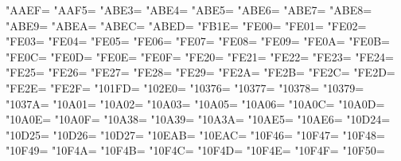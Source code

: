 \XeTeXcharclass"AAEF=\KclassCM
\XeTeXcharclass"AAF5=\KclassCM
\XeTeXcharclass"ABE3=\KclassCM
\XeTeXcharclass"ABE4=\KclassCM
\XeTeXcharclass"ABE5=\KclassCM
\XeTeXcharclass"ABE6=\KclassCM
\XeTeXcharclass"ABE7=\KclassCM
\XeTeXcharclass"ABE8=\KclassCM
\XeTeXcharclass"ABE9=\KclassCM
\XeTeXcharclass"ABEA=\KclassCM
\XeTeXcharclass"ABEC=\KclassCM
\XeTeXcharclass"ABED=\KclassCM
\XeTeXcharclass"FB1E=\KclassCM
\XeTeXcharclass"FE00=\KclassCM
\XeTeXcharclass"FE01=\KclassCM
\XeTeXcharclass"FE02=\KclassCM
\XeTeXcharclass"FE03=\KclassCM
\XeTeXcharclass"FE04=\KclassCM
\XeTeXcharclass"FE05=\KclassCM
\XeTeXcharclass"FE06=\KclassCM
\XeTeXcharclass"FE07=\KclassCM
\XeTeXcharclass"FE08=\KclassCM
\XeTeXcharclass"FE09=\KclassCM
\XeTeXcharclass"FE0A=\KclassCM
\XeTeXcharclass"FE0B=\KclassCM
\XeTeXcharclass"FE0C=\KclassCM
\XeTeXcharclass"FE0D=\KclassCM
\XeTeXcharclass"FE0E=\KclassCM
\XeTeXcharclass"FE0F=\KclassCM
\XeTeXcharclass"FE20=\KclassCM
\XeTeXcharclass"FE21=\KclassCM
\XeTeXcharclass"FE22=\KclassCM
\XeTeXcharclass"FE23=\KclassCM
\XeTeXcharclass"FE24=\KclassCM
\XeTeXcharclass"FE25=\KclassCM
\XeTeXcharclass"FE26=\KclassCM
\XeTeXcharclass"FE27=\KclassCM
\XeTeXcharclass"FE28=\KclassCM
\XeTeXcharclass"FE29=\KclassCM
\XeTeXcharclass"FE2A=\KclassCM
\XeTeXcharclass"FE2B=\KclassCM
\XeTeXcharclass"FE2C=\KclassCM
\XeTeXcharclass"FE2D=\KclassCM
\XeTeXcharclass"FE2E=\KclassCM
\XeTeXcharclass"FE2F=\KclassCM
\XeTeXcharclass"101FD=\KclassCM
\XeTeXcharclass"102E0=\KclassCM
\XeTeXcharclass"10376=\KclassCM
\XeTeXcharclass"10377=\KclassCM
\XeTeXcharclass"10378=\KclassCM
\XeTeXcharclass"10379=\KclassCM
\XeTeXcharclass"1037A=\KclassCM
\XeTeXcharclass"10A01=\KclassCM
\XeTeXcharclass"10A02=\KclassCM
\XeTeXcharclass"10A03=\KclassCM
\XeTeXcharclass"10A05=\KclassCM
\XeTeXcharclass"10A06=\KclassCM
\XeTeXcharclass"10A0C=\KclassCM
\XeTeXcharclass"10A0D=\KclassCM
\XeTeXcharclass"10A0E=\KclassCM
\XeTeXcharclass"10A0F=\KclassCM
\XeTeXcharclass"10A38=\KclassCM
\XeTeXcharclass"10A39=\KclassCM
\XeTeXcharclass"10A3A=\KclassCM
\XeTeXcharclass"10AE5=\KclassCM
\XeTeXcharclass"10AE6=\KclassCM
\XeTeXcharclass"10D24=\KclassCM
\XeTeXcharclass"10D25=\KclassCM
\XeTeXcharclass"10D26=\KclassCM
\XeTeXcharclass"10D27=\KclassCM
\XeTeXcharclass"10EAB=\KclassCM
\XeTeXcharclass"10EAC=\KclassCM
\XeTeXcharclass"10F46=\KclassCM
\XeTeXcharclass"10F47=\KclassCM
\XeTeXcharclass"10F48=\KclassCM
\XeTeXcharclass"10F49=\KclassCM
\XeTeXcharclass"10F4A=\KclassCM
\XeTeXcharclass"10F4B=\KclassCM
\XeTeXcharclass"10F4C=\KclassCM
\XeTeXcharclass"10F4D=\KclassCM
\XeTeXcharclass"10F4E=\KclassCM
\XeTeXcharclass"10F4F=\KclassCM
\XeTeXcharclass"10F50=\KclassCM
